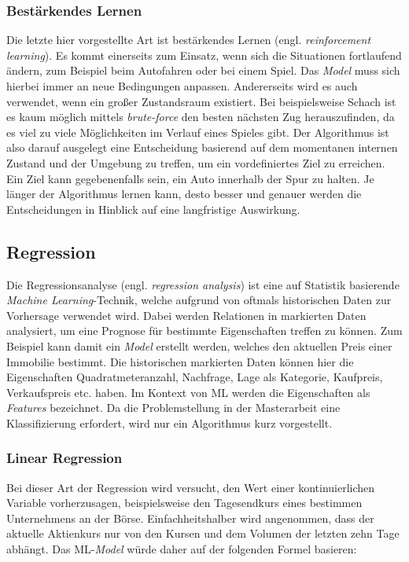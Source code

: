 \subsubsection{Bestärkendes Lernen}
Die letzte hier vorgestellte Art ist bestärkendes Lernen (engl. \textit{reinforcement learning}). Es kommt einerseits zum Einsatz, wenn sich die Situationen fortlaufend ändern, zum Beispiel beim Autofahren oder bei einem Spiel. Das \textit{Model} muss sich hierbei immer an neue Bedingungen anpassen. Andererseits wird es auch verwendet, wenn ein großer Zustandsraum existiert. Bei beispielsweise Schach ist es kaum möglich mittels \textit{brute-force} den besten nächsten Zug herauszufinden, da es viel zu viele Möglichkeiten im Verlauf eines Spieles gibt. Der Algorithmus ist also darauf ausgelegt eine Entscheidung basierend auf dem momentanen internen Zustand und der Umgebung zu treffen, um ein vordefiniertes Ziel zu erreichen. Ein Ziel kann gegebenenfalls sein, ein Auto innerhalb der Spur zu halten. Je länger der Algorithmus lernen kann, desto besser und genauer werden die Entscheidungen in Hinblick auf eine langfristige Auswirkung.

\subsection{Regression}
\label{sec:ml_regression}

Die Regressionsanalyse (engl. \textit{regression analysis}) ist eine auf Statistik basierende \textit{Machine Learning}-Technik, welche aufgrund von oftmals historischen Daten zur Vorhersage verwendet wird. Dabei werden Relationen in markierten Daten analysiert, um eine Prognose für bestimmte Eigenschaften treffen zu können. Zum Beispiel kann damit ein \textit{Model} erstellt werden, welches den aktuellen Preis einer Immobilie bestimmt. Die historischen markierten Daten können hier die Eigenschaften Quadratmeteranzahl, Nachfrage, Lage als Kategorie, Kaufpreis, Verkaufspreis etc. haben. Im Kontext von ML werden die Eigenschaften als \textit{Features} bezeichnet. Da die Problemstellung in der Masterarbeit eine Klassifizierung erfordert, wird nur ein Algorithmus kurz vorgestellt.

\subsubsection{Linear Regression}
\label{sec:linear_regression}

Bei dieser Art der Regression wird versucht, den Wert einer kontinuierlichen Variable vorherzusagen, beispielsweise den Tagesendkurs eines bestimmen Unternehmens an der Börse. Einfachheitshalber wird angenommen, dass der aktuelle Aktienkurs nur von den Kursen und dem Volumen der letzten zehn Tage abhängt. Das ML-\textit{Model} würde daher auf der folgenden Formel basieren:

